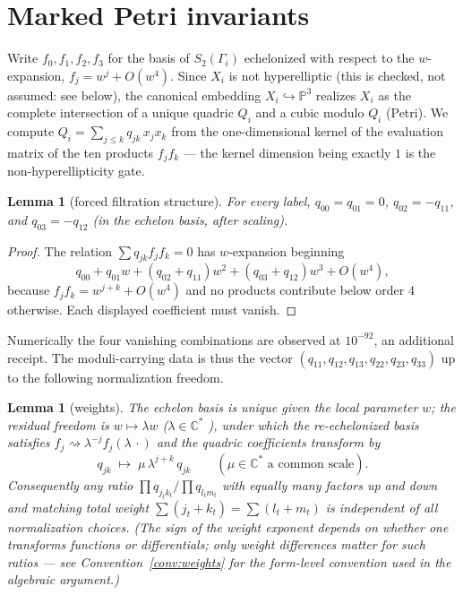 \documentclass[11pt]{amsart}
\newcommand{\CC}{\mathbb{C}}
\newcommand{\PP}{\mathbb{P}}
\theoremstyle{plain}
\newtheorem{lemma}[theorem]{Lemma}
\theoremstyle{definition}
\begin{document}
\section{Marked Petri invariants}\label{sec:invariants}

Write $f_0,f_1,f_2,f_3$ for the basis of $S_2(\Gamma_i)$ echelonized
with respect to the $w$-expansion,
$f_j = w^j + O(w^4)$. Since $X_i$ is not hyperelliptic (this is
checked, not assumed: see below), the canonical embedding
$X_i\hookrightarrow\PP^3$ realizes $X_i$ as the complete intersection
of a unique quadric $Q_i$ and a cubic modulo $Q_i$ (Petri). We compute
$Q_i=\sum_{j\le k} q_{jk}\,x_jx_k$ from the one-dimensional kernel of
the evaluation matrix of the ten products $f_jf_k$ --- the kernel
dimension being exactly $1$ is the non-hyperellipticity gate.

\begin{lemma}[forced filtration structure]\label{lem:filtration}
For every label, $q_{00}=q_{01}=0$, $q_{02}=-q_{11}$, and
$q_{03}=-q_{12}$ \textup{(}in the echelon basis, after scaling\textup{)}.
\end{lemma}

\begin{proof}
The relation $\sum q_{jk} f_jf_k=0$ has $w$-expansion beginning
\[
  q_{00} + q_{01}w + (q_{02}+q_{11})w^2 + (q_{03}+q_{12})w^3 +
  O(w^4),
\]
because $f_jf_k = w^{j+k}+O(w^4)$ and no products contribute below
order $4$ otherwise. Each displayed coefficient must vanish.
\end{proof}

Numerically the four vanishing combinations are observed at
$10^{-92}$, an additional receipt. The moduli-carrying data is thus
the vector $(q_{11},q_{12},q_{13},q_{22},q_{23},q_{33})$ up to the
following normalization freedom.

\begin{lemma}[weights]\label{lem:weights}
The echelon basis is unique given the local parameter $w$; the
residual freedom is $w\mapsto\lambda w$ \textup{(}$\lambda\in\CC^*$%
\textup{)}, under which the re-echelonized basis satisfies
$f_j\rightsquigarrow \lambda^{-j}f_j(\lambda\,\cdot)$ and the quadric
coefficients transform by
\[
  q_{jk} \;\longmapsto\; \mu\,\lambda^{j+k}\,q_{jk}
  \qquad(\mu\in\CC^* \text{ a common scale}).
\]
Consequently any ratio $\prod q_{j_tk_t}\big/\prod q_{l_tm_t}$ with
equally many factors up and down and matching total weight
$\sum(j_t+k_t)=\sum(l_t+m_t)$ is independent of all normalization
choices. \textup{(}The sign of the weight exponent depends on
whether one transforms functions or differentials; only weight
\emph{differences} matter for such ratios --- see
Convention~\ref{conv:weights} for the form-level convention used in
the algebraic argument.\textup{)}
\end{lemma}
\end{document}
